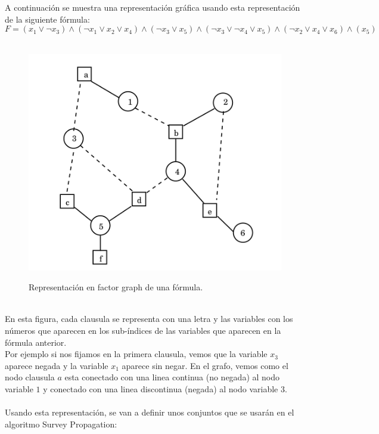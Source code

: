 \pagebreak
A continuación se muestra una representación gráfica usando esta representación de la siguiente fórmula:\\
\[F = (x_1 \lor\neg x_3) \land (\neg x_1 \lor x_2 \lor x_4) \land (\neg x_3 \lor x_5) \land (\neg x_3 \lor \neg x_4 \lor x_5) \land (\neg x_2 \lor x_4 \lor x_6) \land (x_5)\]\\
\begin{figure}[!htbp]
	\centering
	\includegraphics[scale=0.5]{img/fg}
	\label{img:fg1}
	\caption{Representación en factor graph de una fórmula.}
\end{figure}\\
En esta figura, cada clausula se representa con una letra y las variables con los números que aparecen en los sub-índices de las variables que aparecen en la fórmula anterior.\\
Por ejemplo si nos fijamos en la primera clausula, vemos que la variable $x_3$ aparece negada y la variable $x_1$ aparece sin negar. En el grafo, vemos como el nodo clausula $a$ esta conectado con una linea continua (no negada) al nodo variable $1$ y conectado con una linea discontinua (negada) al nodo variable $3$. \\\\
Usando esta representación, se van a definir unos conjuntos que se usarán en el algoritmo Survey Propagation:
